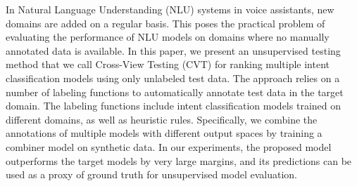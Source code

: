 In Natural Language Understanding (NLU) systems in voice assistants, new domains are added on a regular basis. This poses the practical problem of evaluating the performance of NLU models on domains where no manually annotated data is available. In this paper, we present an unsupervised testing method that we call Cross-View Testing (CVT) for ranking multiple intent classification models using only unlabeled test data. The approach relies on a number of labeling functions to automatically annotate test data in the target domain. The labeling functions include intent classification models trained on different domains, as well as heuristic rules. Specifically, we combine the annotations of multiple models with different output spaces by training a combiner model on synthetic data. In our experiments, the proposed model outperforms the target models by very large margins, and its predictions can be used as a proxy of ground truth for unsupervised model evaluation.
